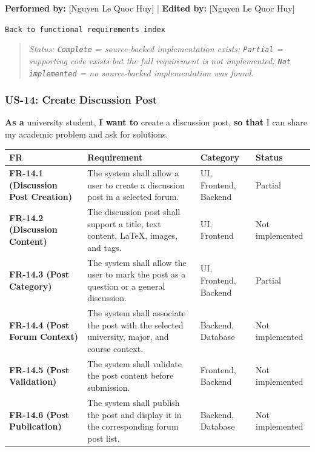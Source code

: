\documentclass[12pt]{article}
\renewcommand{\baselinestretch}{1.5}
\begin{document}
\textbf{Performed by:} [Nguyen Le Quoc Huy] | \textbf{Edited by:} [Nguyen Le Quoc Huy]
\par\medskip

\texttt{Back to functional requirements index}
\par\medskip

\begin{quote}
\textit{Status: \texttt{Complete} = source-backed implementation exists; \texttt{Partial} = supporting code exists but the full requirement is not implemented; \texttt{Not implemented} = no source-backed implementation was found.}
\end{quote}
\par\medskip

\hypertarget{sec:us-14-create-discussion-post}{}
\subsubsection*{US-14: Create Discussion Post}
\par\medskip

\textbf{As a} university student, \textbf{I want to} create a discussion post, \textbf{so that} I can share my academic problem and ask for solutions.
\par\medskip

\begingroup
\small
\renewcommand{\baselinestretch}{1.0}\selectfont
\renewcommand{\arraystretch}{1.15}
\setlength{\tabcolsep}{6pt}
\begin{longtable}{|>{\raggedright\arraybackslash}p{}|>{\raggedright\arraybackslash}p{}|>{\raggedright\arraybackslash}p{}|>{\raggedright\arraybackslash}p{}|}
\hline
\textbf{FR} & \textbf{Requirement} & \textbf{Category} & \textbf{Status} \\ \hline
\endhead
\textbf{FR-14.1 (Discussion Post Creation)} & The system shall allow a user to create a discussion post in a selected forum. & UI, Frontend, Backend & Partial \\ \hline
\textbf{FR-14.2 (Discussion Content)} & The discussion post shall support a title, text content, LaTeX, images, and tags. & UI, Frontend & Not implemented \\ \hline
\textbf{FR-14.3 (Post Category)} & The system shall allow the user to mark the post as a question or a general discussion. & UI, Frontend, Backend & Partial \\ \hline
\textbf{FR-14.4 (Post Forum Context)} & The system shall associate the post with the selected university, major, and course context. & Backend, Database & Not implemented \\ \hline
\textbf{FR-14.5 (Post Validation)} & The system shall validate the post content before submission. & Frontend, Backend & Not implemented \\ \hline
\textbf{FR-14.6 (Post Publication)} & The system shall publish the post and display it in the corresponding forum post list. & Backend, Database & Not implemented \\ \hline
\end{longtable}
\endgroup
\par\medskip
\end{document}
